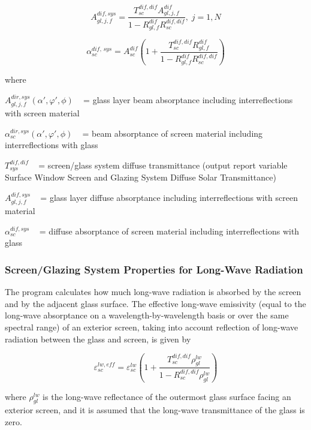 \begin{equation}
A_{gl,j,f}^{dif,sys} = \frac{{T_{sc}^{dif,dif}A_{gl,j,f}^{dif}}}{{1 - R_{gl,f}^{dif}R_{sc}^{dif,dif}}},\;j = 1,N
\end{equation}

\begin{equation}
\alpha_{sc}^{dif,\,sys} = A_{sc}^{dif}\left( {1 + \frac{{T_{sc}^{dif,dif}R_{gl,f}^{dif}}}{{1 - R_{gl,f}^{dif}R_{sc}^{dif,dif}}}} \right)
\end{equation}

where

\(A_{gl,j,f}^{dir,sys}\left( {\alpha ',\varphi ',\phi } \right)\) ~ = glass layer beam absorptance including interreflections with screen material

\(\alpha_{sc}^{dir,sys}\left( {\alpha ',\varphi ',\phi } \right)\) ~ = beam absorptance of screen material including interreflections with glass

\(T_{sys}^{dif,dif}\) ~ = screen/glass system diffuse transmittance (output report variable Surface Window Screen and Glazing System Diffuse Solar Transmittance)

\(A_{gl,j,f}^{dif,sys}\) ~ = glass layer diffuse absorptance including interreflections with screen material

\(\alpha_{sc}^{dif,sys}\) ~ = diffuse absorptance of screen material including interreflections with glass

\subsubsection{Screen/Glazing System Properties for Long-Wave Radiation}\label{screenglazing-system-properties-for-long-wave-radiation}

The program calculates how much long-wave radiation is absorbed by the screen and by the adjacent glass surface. The effective long-wave emissivity (equal to the long-wave absorptance on a wavelength-by-wavelength basis or over the same spectral range) of an exterior screen, taking into account reflection of long-wave radiation between the glass and screen, is given by

\begin{equation}
\varepsilon_{sc}^{lw,eff} = \varepsilon_{sc}^{lw}\left( {1 + \frac{{T_{sc}^{dif,dif}\rho_{gl}^{lw}}}{{1 - R_{sc}^{dif,dif}\rho_{gl}^{lw}}}} \right)
\end{equation}

where \(\rho_{gl}^{lw}\) is the long-wave reflectance of the outermost glass surface facing an exterior screen, and it is assumed that the long-wave transmittance of the glass is zero.

